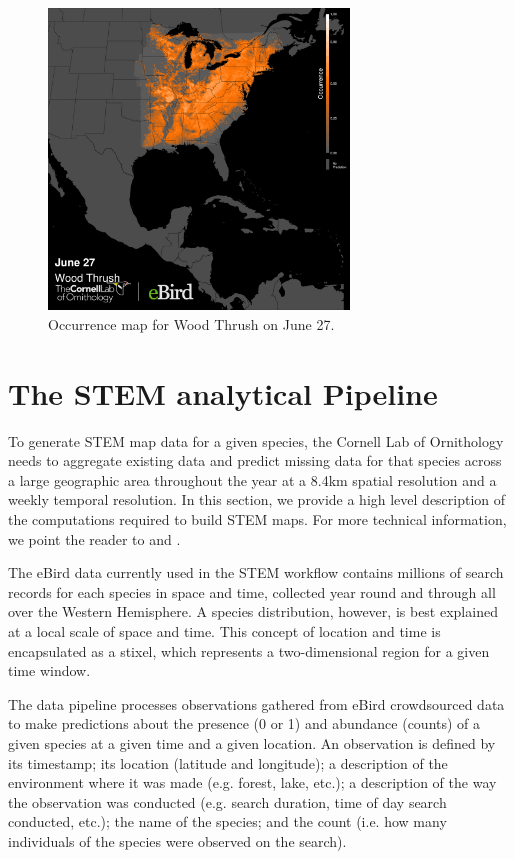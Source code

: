 \documentclass{acm_proc_article-sp}
\begin{document}
\begin{figure}[h]
    \centering
    \includegraphics[width=8cm]{IMG/stem.png}
    \caption{Occurrence map for Wood Thrush on June 27.}
    \label{fig::stem}
\end{figure}

\section{The STEM analytical Pipeline}\label{sec::pipeline}
To generate STEM map data for a given species, the Cornell Lab of Ornithology needs to aggregate existing data and predict missing data for that species across a large geographic area throughout the year at a 8.4km spatial resolution and a weekly temporal resolution. In this section, we provide a high level description of the computations required to build STEM maps. For more technical information, we point the reader to \cite{Fink2010-fb} and \cite{Johnston2015-pf}.

The eBird data currently used in the STEM workflow contains millions of search records for each species in space and time, collected year round and through all over the Western Hemisphere. A species distribution, however, is best explained at a local scale of space and time. This concept of location and time is encapsulated as a stixel, which represents a two-dimensional region for a given time window.

The data pipeline processes observations gathered from eBird crowdsourced data to make predictions about the presence (0 or 1) and abundance (counts) of a given species at a given time and a given location. An observation is defined by its timestamp; its location (latitude and longitude); a description of the environment where it was made (e.g. forest, lake, etc.); a description of the way the observation was conducted (e.g. search duration, time of day search conducted, etc.); the name of the species; and the count (i.e. how many individuals of the species were observed on the search).
\end{document}
